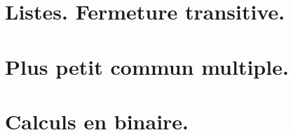 \section{Listes. Fermeture transitive.}

\section{Plus petit commun multiple.}

\section{Calculs en binaire.}

